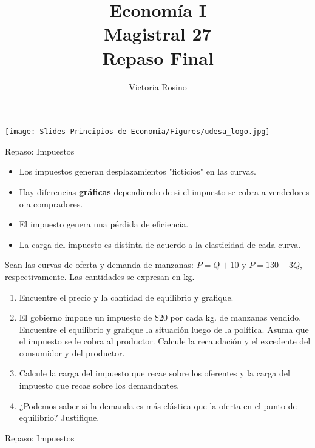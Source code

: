 \documentclass{beamer}
\title[Economía I]{Economía I \vspace{3mm}
\\ Magistral 27 \vspace{3mm} \\ Repaso Final}
\date{}
\author[Victoria Rosino]{Victoria Rosino}
\institute[]{Universidad de San Andrés}
\begin{document}
\begin{frame}
\vspace{0.3cm}
\titlepage
\centering
\vspace{-0.9cm}
\texttt{[image: Slides Principios de Economia/Figures/udesa\_logo.jpg]} 
\end{frame}


\begin{frame}{Repaso: Impuestos}
    \small
    \begin{itemize}
        \item Los impuestos generan desplazamientos "ficticios" en las curvas.
        \item Hay diferencias \textbf{gráficas} dependiendo de si el impuesto se cobra a vendedores o a compradores.
        \item El impuesto genera una pérdida de eficiencia.
        \item La carga del impuesto es distinta de acuerdo a la elasticidad de cada curva.
    \end{itemize}

    Sean las curvas de oferta y demanda de manzanas: \( P = Q + 10 \) y \( P = 130 - 3Q \), respectivamente. Las cantidades se expresan en kg.

    \begin{enumerate}
        \item Encuentre el precio y la cantidad de equilibrio y grafique.
        \item El gobierno impone un impuesto de \$20 por cada kg. de manzanas vendido. Encuentre el equilibrio y grafique la situación luego de la política. Asuma que el impuesto se le cobra al productor. Calcule la recaudación y el excedente del consumidor y del productor.
        \item Calcule la carga del impuesto que recae sobre los oferentes y la carga del impuesto que recae sobre los demandantes.
        \item ¿Podemos saber si la demanda es más elástica que la oferta en el punto de equilibrio? Justifique.
    \end{enumerate}
\end{frame}

\begin{frame}{Repaso: Impuestos}

\end{frame}
\end{document}
